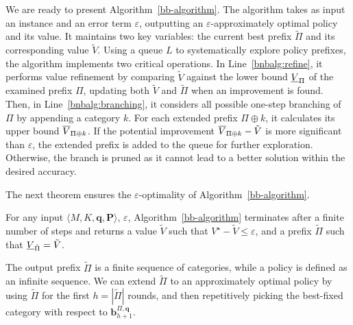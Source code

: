 We are ready to present Algorithm~\ref{bb-algorithm}. The algorithm takes as input an instance and an error term $\varepsilon$, outputting an $\varepsilon$-approximately optimal policy and its value. It maintains two key variables: the current best prefix $\tilde \Pi$ and its corresponding value $\tilde V$. Using a queue $L$ to systematically explore policy prefixes, the algorithm implements two critical operations. In Line~\ref{bnbalg:refine}, it performs value refinement by comparing $\tilde V$ against the lower bound $\underline{V}_{\Pi}$ of the examined prefix $\Pi$, updating both $\tilde V$ and $\tilde \Pi$ when an improvement is found. Then, in Line~\ref{bnbalg:branching}, it considers all possible one-step branching of $\Pi$ by appending a category $k$. For each extended prefix $\Pi \oplus k$, it calculates its upper bound $\overline{V}_{\Pi \oplus k}$. If the potential improvement $\overline{V}_{\Pi \oplus k} - \tilde{V}$ is more significant than $\varepsilon$, the extended prefix is added to the queue for further exploration. Otherwise, the branch is pruned as it cannot lead to a better solution within the desired accuracy.

The next theorem ensures the $\varepsilon$-optimality of Algorithm~\ref{bb-algorithm}.
\begin{theorem}\label{thm:bb-algorithm-bounded-error}
  For any input $\langle M, K, \bm{q}, \bm{P} \rangle$, $\varepsilon$, Algorithm~\ref{bb-algorithm} terminates after a finite number of steps and returns a value $\tilde V$ such that $V^{\star} - \tilde V \leq \varepsilon$, and a prefix $\tilde \Pi$ such that $\underline{V}_{\tilde \Pi} = \tilde V$.
\end{theorem}
\begin{remark}
  \normalfont
  The output prefix $\tilde{\Pi}$ is a finite sequence of categories, while a policy is defined as an infinite sequence. We can extend $\tilde{\Pi}$ to an approximately optimal policy by using $\tilde{\Pi}$ for the first $h = |\tilde{\Pi}|$ rounds, and then repetitively picking the best-fixed category with respect to $\bm{b}^{\Pi, \bm{q}}_{h+1}$.
\end{remark}

